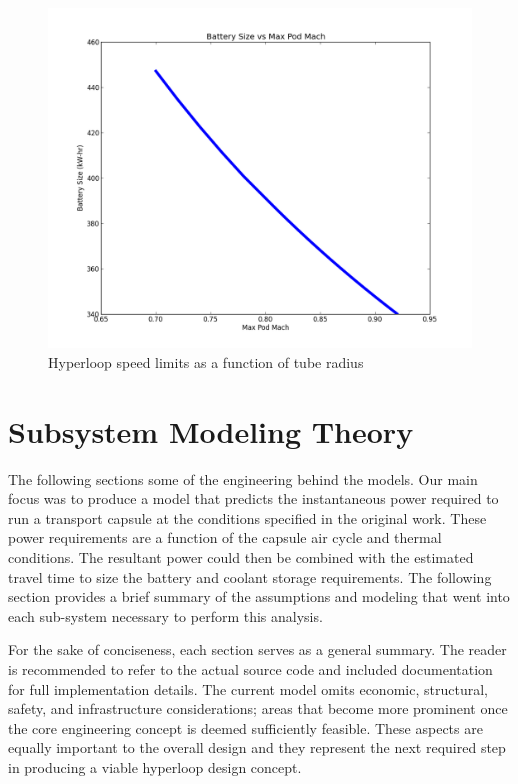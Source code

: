 \documentclass[heading.tex]{subfiles}
\begin{document}
\begin{figure}[hbtp]
\centering
\includegraphics[scale=0.5]{images/mach_vs_energy.png}
\caption{Hyperloop speed limits as a function of tube radius}
\end{figure}

\section{Subsystem Modeling Theory}

The following sections some of the engineering behind the models. Our main focus was to produce a model that predicts the instantaneous
power required to run a transport capsule at the conditions specified in the original work. These power requirements are a function of the
capsule air cycle and thermal conditions. The resultant power could then be combined with the estimated travel time to size the battery
and coolant storage requirements. The following section provides a brief summary of the assumptions and modeling that went into each
sub-system necessary to perform this analysis.

For the sake of conciseness, each section serves as a general summary. The reader is recommended to refer to the actual source code and
included documentation for full implementation details. The current model omits economic, structural, safety, and infrastructure
considerations; areas that become more prominent once the core engineering concept is deemed sufficiently feasible. These aspects are
equally important to the overall design and they represent the next required step in producing a viable hyperloop design concept.
\end{document}
